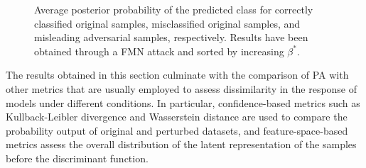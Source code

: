 \begin{figure}[H]
    \caption{Average posterior probability of the predicted class for 
    correctly classified original samples, misclassified original samples, and 
    misleading adversarial samples, respectively. Results have been obtained through a FMN attack 
    and sorted by increasing $\beta^{*}$.}
    \label{fig:appendix_adversarial_distribution_fmn}
\end{figure}

The results obtained in this section culminate with the comparison of PA with other metrics that 
are usually employed to assess dissimilarity in the response of models under different conditions. In
particular, confidence-based metrics such as Kullback-Leibler divergence and Wasserstein distance are 
used to compare the probability output of original and perturbed datasets, and feature-space-based
metrics assess the overall distribution of the latent representation of the samples before
the discriminant function.

